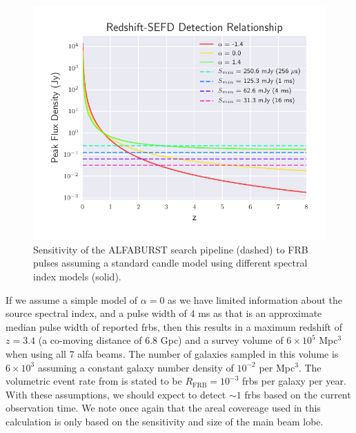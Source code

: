 \documentclass[a4paper,fleqn,usenatbib]{mnras}
\begin{document}
\begin{figure}
    \includegraphics[width=1.0\linewidth]{figures/fwhm_sefd_z_relation.pdf}
    \caption{Sensitivity of the ALFABURST search pipeline (dashed) to FRB pulses
    assuming a standard candle model using different spectral index models
    (solid).
    }
    \label{fig:fwhm_sefd_z}
\end{figure}

If we assume a simple model of $\alpha=0$ as we have limited information about
the source spectral index, and a pulse width of 4 ms as that is an approximate
median pulse width of reported \glspl{frb}, then this results in a maximum
redshift of $z=3.4$ (a co-moving distance of 6.8 Gpc) and a survey volume of $6
\times 10^5$ Mpc$^3$ when using all 7 \gls{alfa} beams. The number of galaxies
sampled in this volume is $6 \times 10^3$ assuming a constant galaxy number
density of $10^{-2}$ per Mpc$^3$.  The volumetric event rate from
\cite{2013Sci...341...53T} is stated to be $R_{\textrm{FRB}} = 10^{-3}$
\glspl{frb} per galaxy per year. With these assumptions, we should expect to
detect $\sim 1$ \glspl{frb} based on the current observation time. We note once
again that the areal covereage used in this calculation is only based on the
sensitivity and size of the main beam lobe.
\end{document}
